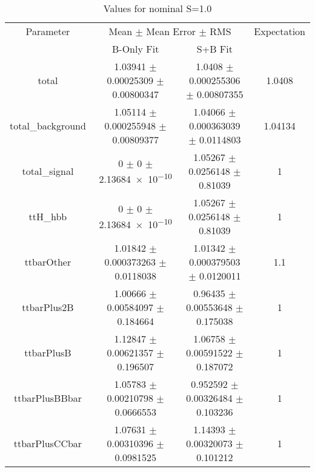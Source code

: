 \begin{table}
\centering
\caption{Values for nominal S=1.0}
\begin{tabular}{cccc}
\toprule
Parameter & \multicolumn{2}{c}{Mean $\pm$ Mean Error $\pm$ RMS} & Expectation\\
 & B-Only Fit & S+B Fit & \\
\midrule
total & \num{1.03941} $\pm$ \num{0.00025309} $\pm$ \num{0.00800347} & \num{1.0408} $\pm$ \num{0.000255306} $\pm$ \num{0.00807355} & \num{1.0408}\\
total\_background & \num{1.05114} $\pm$ \num{0.000255948} $\pm$ \num{0.00809377} & \num{1.04066} $\pm$ \num{0.000363039} $\pm$ \num{0.0114803} & \num{1.04134}\\
total\_signal & \num{0} $\pm$ \num{0} $\pm$ \num{2.13684e-10} & \num{1.05267} $\pm$ \num{0.0256148} $\pm$ \num{0.81039} & \num{1}\\
ttH\_hbb & \num{0} $\pm$ \num{0} $\pm$ \num{2.13684e-10} & \num{1.05267} $\pm$ \num{0.0256148} $\pm$ \num{0.81039} & \num{1}\\
ttbarOther & \num{1.01842} $\pm$ \num{0.000373263} $\pm$ \num{0.0118038} & \num{1.01342} $\pm$ \num{0.000379503} $\pm$ \num{0.0120011} & \num{1.1}\\
ttbarPlus2B & \num{1.00666} $\pm$ \num{0.00584097} $\pm$ \num{0.184664} & \num{0.96435} $\pm$ \num{0.00553648} $\pm$ \num{0.175038} & \num{1}\\
ttbarPlusB & \num{1.12847} $\pm$ \num{0.00621357} $\pm$ \num{0.196507} & \num{1.06758} $\pm$ \num{0.00591522} $\pm$ \num{0.187072} & \num{1}\\
ttbarPlusBBbar & \num{1.05783} $\pm$ \num{0.00210798} $\pm$ \num{0.0666553} & \num{0.952592} $\pm$ \num{0.00326484} $\pm$ \num{0.103236} & \num{1}\\
ttbarPlusCCbar & \num{1.07631} $\pm$ \num{0.00310396} $\pm$ \num{0.0981525} & \num{1.14393} $\pm$ \num{0.00320073} $\pm$ \num{0.101212} & \num{1}\\
\bottomrule
\end{tabular}
\end{table}